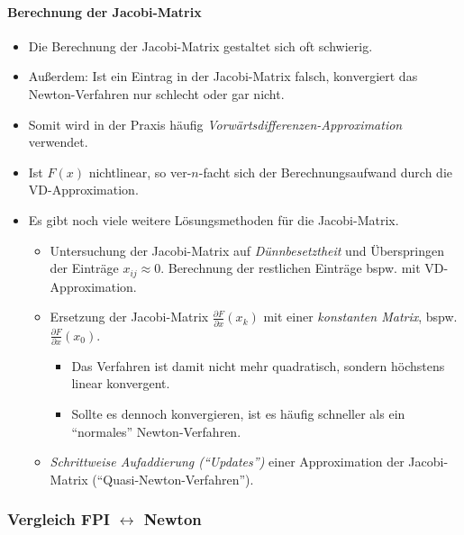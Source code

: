                 \paragraph{Berechnung der Jacobi-Matrix} %
                    \begin{itemize}
                    	\item Die Berechnung der Jacobi-Matrix gestaltet sich oft schwierig.
                    	\item Außerdem: Ist ein Eintrag in der Jacobi-Matrix falsch, konvergiert das Newton-Verfahren nur schlecht oder gar nicht.
                    	\item Somit wird in der Praxis häufig \textit{Vorwärtsdifferenzen-Approximation} verwendet.
                    	\item Ist \( F(x) \) nichtlinear, so ver-\(n\)-facht sich der Berechnungsaufwand durch die VD-Approximation.
                    	\item Es gibt noch viele weitere Lösungsmethoden für die Jacobi-Matrix.
                        	\begin{itemize}
                        		\item Untersuchung der Jacobi-Matrix auf \textit{Dünnbesetztheit} und Überspringen der Einträge \( x _ {ij} \approx 0 \). Berechnung der restlichen Einträge bspw. mit VD-Approximation.
                        		\item Ersetzung der Jacobi-Matrix \( \frac{\partial F}{\partial x} (x _ k) \) mit einer \textit{konstanten Matrix}, bspw. \( \frac{\partial F}{\partial x} (x _ 0) \).
	                        		\begin{itemize}
	                        			\item Das Verfahren ist damit nicht mehr quadratisch, sondern höchstens linear konvergent.
	                        			\item Sollte es dennoch konvergieren, ist es häufig schneller als ein \enquote{normales} Newton-Verfahren.
	                        		\end{itemize}
                        		\item \textit{Schrittweise Aufaddierung (\enquote{Updates})} einer Approximation der Jacobi-Matrix (\enquote{Quasi-Newton-Verfahren}).
                        	\end{itemize}
                    \end{itemize}

            \subsubsection{Vergleich FPI \( \leftrightarrow \) Newton} %
